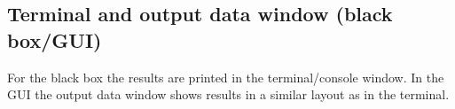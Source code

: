 \subsection{Terminal and output data window (black box/GUI)}
\label{subsec:terminal}
For the black box the results are printed in the terminal/console window.
In the GUI the output data window shows results in a similar layout as in the terminal.
